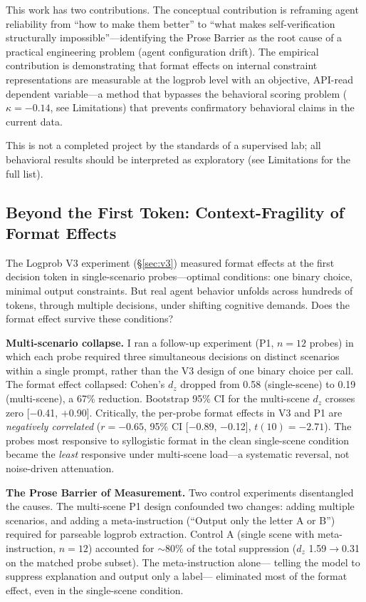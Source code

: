 \documentclass[11pt]{article}
\begin{document}
This work has two contributions. The conceptual contribution is reframing agent
reliability from ``how to make them better'' to ``what makes self-verification
structurally impossible''---identifying the Prose Barrier as the root cause of
a practical engineering problem (agent configuration drift). The empirical
contribution is demonstrating that format effects on internal constraint
representations are measurable at the logprob level with an objective,
API-read dependent variable---a method that bypasses the behavioral scoring
problem ($\kappa=-0.14$, see Limitations) that prevents confirmatory behavioral
claims in the current data.

This is not a completed project by the standards of a supervised lab; all
behavioral results should be interpreted as exploratory (see Limitations for
the full list).

\subsection{Beyond the First Token: Context-Fragility of Format Effects}

The Logprob V3 experiment (\S\ref{sec:v3}) measured format effects at the first
decision token in single-scenario probes---optimal conditions: one binary choice,
minimal output constraints. But real agent behavior unfolds across hundreds of
tokens, through multiple decisions, under shifting cognitive demands. Does the
format effect survive these conditions?

\textbf{Multi-scenario collapse.} I ran a follow-up experiment (P1, $n=12$
probes) in which each probe required three simultaneous decisions on distinct
scenarios within a single prompt, rather than the V3 design of one binary choice
per call. The format effect collapsed: Cohen's $d_z$ dropped from 0.58
(single-scene) to 0.19 (multi-scene), a 67\% reduction. Bootstrap 95\% CI for
the multi-scene $d_z$ crosses zero [$-$0.41, $+$0.90]. Critically, the
per-probe format effects in V3 and P1 are \textit{negatively correlated}
($r=-0.65$, 95\% CI [$-$0.89, $-$0.12], $t(10)=-2.71$). The probes most
responsive to syllogistic format in the clean single-scene condition became the
\textit{least} responsive under multi-scene load---a systematic reversal, not
noise-driven attenuation.

\textbf{The Prose Barrier of Measurement.} Two control experiments disentangled
the causes. The multi-scene P1 design confounded two changes: adding multiple
scenarios, and adding a meta-instruction (``Output only the letter A or B'')
required for parseable logprob extraction. Control A (single scene with
meta-instruction, $n=12$) accounted for $\sim$80\% of the total suppression
($d_z$ 1.59$\to$0.31 on the matched probe subset). The meta-instruction alone---
telling the model to suppress explanation and output only a label---
eliminated most of the format effect, even in the single-scene condition.
\end{document}
